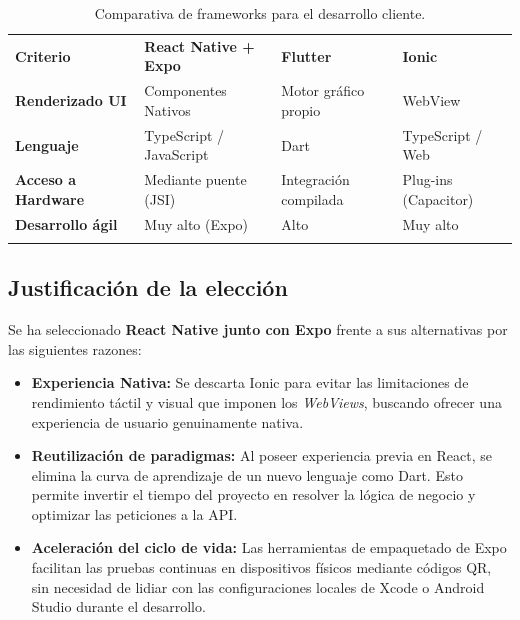 \begin{table}[H]
    \renewcommand{\arraystretch}{1.25}
    \begin{tabularx}{\textwidth}{>{\RaggedRight\arraybackslash}p{1.9cm} >{\RaggedRight\arraybackslash}X >{\RaggedRight\arraybackslash}X >{\RaggedRight\arraybackslash}X}
        \textbf{Criterio} & \textbf{React Native + Expo} & \textbf{Flutter} & \textbf{Ionic} \\ \lightrule
        \textbf{Renderizado UI} & Componentes Nativos & Motor gráfico propio & WebView \\ \lightrule
        \textbf{Lenguaje} & TypeScript / JavaScript & Dart & TypeScript / Web \\ \lightrule
        \textbf{Acceso a Hardware} & Mediante puente (JSI) & Integración compilada & Plug-ins (Capacitor) \\ \lightrule
        \textbf{Desarrollo ágil} & Muy alto (Expo) & Alto & Muy alto \\ \lightrule
    \end{tabularx}
    \caption{Comparativa de frameworks para el desarrollo cliente.}
    \label{tab:comparativa-frontend}
\end{table}

\subsection*{Justificación de la elección}

Se ha seleccionado \textbf{React Native junto con Expo} frente a sus alternativas por las siguientes razones:
\begin{itemize}
    \item \textbf{Experiencia Nativa:} Se descarta Ionic para evitar las limitaciones de rendimiento táctil y visual que imponen los \emph{WebViews}, buscando ofrecer una experiencia de usuario genuinamente nativa.
    \item \textbf{Reutilización de paradigmas:} Al poseer experiencia previa en React, se elimina la curva de aprendizaje de un nuevo lenguaje como Dart. Esto permite invertir el tiempo del proyecto en resolver la lógica de negocio y optimizar las peticiones a la API.
    \item \textbf{Aceleración del ciclo de vida:} Las herramientas de empaquetado de Expo facilitan las pruebas continuas en dispositivos físicos mediante códigos QR, sin necesidad de lidiar con las configuraciones locales de Xcode o Android Studio durante el desarrollo.
\end{itemize}
